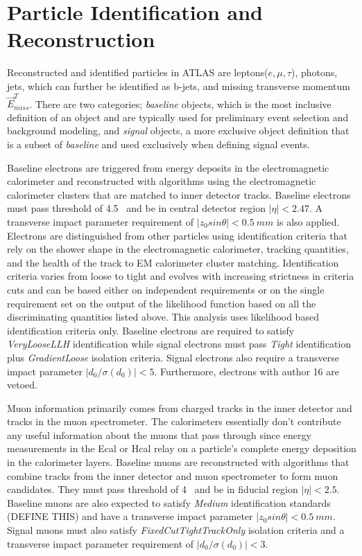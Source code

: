 \section{Particle Identification and Reconstruction}
Reconstructed and identified particles in ATLAS are leptons($e, \mu, \tau$), photons, jets, which can further be identified as b-jets, and missing transverse momentum $\vec{E}^T_{miss}$.   There are two categories; \textit{baseline} objects, which is the most inclusive definition of an object and are typically used for preliminary event selection and background modeling, and \textit{signal} objects, a more exclusive object definition that is a subset of \textit{baseline} and used exclusively when defining signal events. 

Baseline electrons are triggered from energy deposits in the electromagnetic calorimeter and reconstructed with algorithms using the electromagnetic calorimeter clusters that are matched to inner detector tracks.  Baseline electrons must pass \pt{} threshold of 4.5 ~\GeV and be in central detector region $|\eta | < 2.47$.  A transverse impact parameter requirement of $|z_0sin\theta| < 0.5~mm$ is also applied.  Electrons are distinguished from other particles using identification criteria that rely on the shower shape in the electromagnetic calorimeter, tracking quantities, and the health of the track to EM calorimeter cluster matching.  Identification criteria varies from loose to tight and evolves with increasing strictness in criteria cuts and can be based either on independent requirements or on the single requirement set on the output of the likelihood function based on all the discriminating quantities listed above.  This analysis uses likelihood based identification criteria only.  Baseline electrons are required to satisfy \textit{VeryLooseLLH} identification while signal electrons must pass  \textit{Tight} identification plus \textit{GradientLoose} isolation criteria.  Signal electrons also require a transverse impact parameter $|d_0/\sigma(d_0)| < 5$. Furthermore, electrons with author 16 are vetoed.  

Muon information primarily comes from charged tracks in the inner detector and tracks in the muon spectrometer.  The calorimeters essentially don't contribute any useful information about the muons that pass through since energy measurements in the Ecal or Hcal relay on a particle's complete energy deposition in the calorimeter layers.   Baseline muons are reconstructed with algorithms that combine tracks from the inner detector and muon spectrometer to form muon candidates.  They must pass \pt{} threshold of 4 ~\GeV and be in fiducial region $|\eta | < 2.5$. Baseline muons are also expected to satisfy \textit{Medium} identification standards (DEFINE THIS) and have a transverse impact parameter $|z_0sin\theta| < 0.5~mm$.  Signal muons must also satisfy \textit{FixedCutTightTrackOnly} isolation criteria and a transverse impact parameter requirement of $|d_0/\sigma(d_0)| < 3$.

